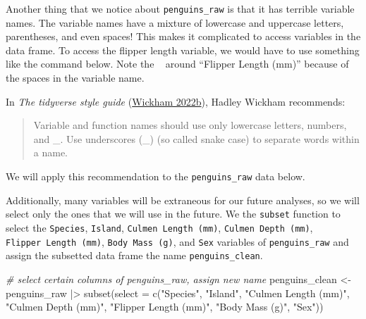 \documentclass[
]{book}
\newenvironment{Shaded}{\begin{snugshade}}{\end{snugshade}}
\newcommand{\AttributeTok}[1]{\textcolor[rgb]{0.77,0.63,0.00}{#1}}
\newcommand{\CommentTok}[1]{\textcolor[rgb]{0.56,0.35,0.01}{\textit{#1}}}
\newcommand{\DocumentationTok}[1]{\textcolor[rgb]{0.56,0.35,0.01}{\textbf{\textit{#1}}}}
\newcommand{\FunctionTok}[1]{\textcolor[rgb]{0.00,0.00,0.00}{#1}}
\newcommand{\NormalTok}[1]{#1}
\newcommand{\OtherTok}[1]{\textcolor[rgb]{0.56,0.35,0.01}{#1}}
\newcommand{\SpecialCharTok}[1]{\textcolor[rgb]{0.00,0.00,0.00}{#1}}
\newcommand{\StringTok}[1]{\textcolor[rgb]{0.31,0.60,0.02}{#1}}
\theoremstyle{definition}
\theoremstyle{definition}
\theoremstyle{definition}
\theoremstyle{definition}
\theoremstyle{remark}
\begin{document}
Another thing that we notice about \texttt{penguins\_raw} is that it has terrible variable names. The variable names have a mixture of lowercase and uppercase letters, parentheses, and even spaces! This makes it complicated to access variables in the data frame. To access the flipper length variable, we would have to use something like the command below. Note the \texttt{\textasciigrave{}\ \textasciigrave{}} around ``Flipper Length (mm)'' because of the spaces in the variable name.

\begin{Shaded}
\end{Shaded}

In \emph{The tidyverse style guide} (\protect\hyperlink{ref-tidyversestyleguide}{Wickham 2022b}), Hadley Wickham recommends:

\begin{quote}
Variable and function names should use only lowercase letters, numbers, and \_. Use underscores (\_) (so called snake case) to separate words within a name.
\end{quote}

We will apply this recommendation to the \texttt{penguins\_raw} data below.

Additionally, many variables will be extraneous for our future analyses, so we will select only the ones that we will use in the future. We the \texttt{subset} function to select the \texttt{Species}, \texttt{Island}, \texttt{Culmen\ Length\ (mm)}, \texttt{Culmen\ Depth\ (mm)}, \texttt{Flipper\ Length\ (mm)}, \texttt{Body\ Mass\ (g)}, and \texttt{Sex} variables of \texttt{penguins\_raw} and assign the subsetted data frame the name \texttt{penguins\_clean}.

\begin{Shaded}
\begin{Highlighting}[]
\CommentTok{\# select certain columns of penguins\_raw, assign new name}
\NormalTok{penguins\_clean }\OtherTok{\textless{}{-}}
\NormalTok{  penguins\_raw }\SpecialCharTok{|\textgreater{}}
  \FunctionTok{subset}\NormalTok{(}\AttributeTok{select =} \FunctionTok{c}\NormalTok{(}\StringTok{"Species"}\NormalTok{, }\StringTok{"Island"}\NormalTok{, }\StringTok{"Culmen Length (mm)"}\NormalTok{, }\StringTok{"Culmen Depth (mm)"}\NormalTok{, }\StringTok{"Flipper Length (mm)"}\NormalTok{, }\StringTok{"Body Mass (g)"}\NormalTok{, }\StringTok{"Sex"}\NormalTok{))}
\end{Highlighting}
\end{Shaded}
\end{document}
